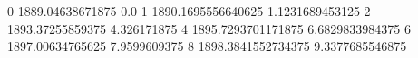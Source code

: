 0 1889.04638671875 0.0
1 1890.1695556640625 1.1231689453125
2 1893.37255859375 4.326171875
4 1895.7293701171875 6.6829833984375
6 1897.00634765625 7.9599609375
8 1898.3841552734375 9.3377685546875
